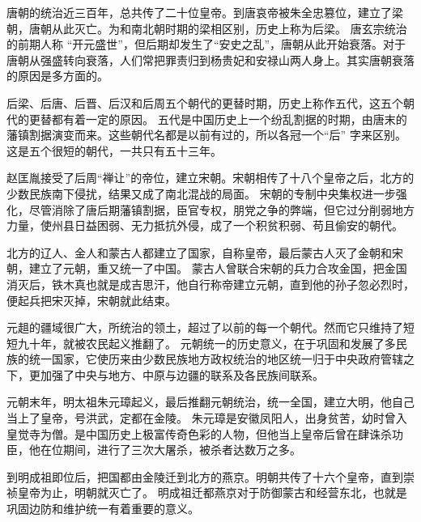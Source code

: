 \documentclass[avery5371,grid]{flashcards}
\begin{document}
{唐朝的统治近三百年，总共传了二十位皇帝。到唐哀帝被朱全忠篡位，建立了梁朝，唐朝从此灭亡。为和南北朝时期的梁相区别，历史上称为后梁。} %
{唐玄宗统治的前期人称 “开元盛世”，但后期却发生了“安史之乱”，唐朝从此开始衰落。对于唐朝从强盛转向衰落，人们常把罪责归到杨贵妃和安禄山两人身上。其实唐朝衰落的原因是多方面的。} %

{后梁、后唐、后晋、后汉和后周五个朝代的更替时期，历史上称作五代，这五个朝代的更替都有着一定的原因。} %
{五代是中国历史上一个纷乱割据的时期，由唐末的藩镇割据演变而来。这些朝代名都是以前有过的，所以各冠一个“后” 字来区别。这是五个很短的朝代，一共只有五十三年。} %

{赵匡胤接受了后周“禅让”的帝位，建立宋朝。宋朝相传了十八个皇帝之后，北方的少数民族南下侵扰，结果又成了南北混战的局面。} %
{宋朝的专制中央集权进一步强化，尽管消除了唐后期藩镇割据，臣官专权，朋党之争的弊端，但它过分削弱地方力量，使州县日益困弱、无力抵抗外侵，成了一个积贫积弱、苟且偷安的朝代。} %



{北方的辽人、金人和蒙古人都建立了国家，自称皇帝，最后蒙古人灭了金朝和宋朝，建立了元朝，重又统一了中国。} %
{蒙古人曾联合宋朝的兵力合攻金国，把金国消灭后，铁木真也就是成吉思汗，他自行称帝建立元朝，直到他的孙子忽必烈时，便起兵把宋灭掉，宋朝就此结束。} %

{元趄的疆域很广大，所统治的领土，超过了以前的每一个朝代。然而它只维持了短短九十年，就被农民起义推翻了。} %
{元朝统一的历史意义，在于巩固和发展了多民族的统一国家，它使历来由少数民族地方政权统治的地区统一归于中央政府管辖之下，更加强了中央与地方、中原与边疆的联系及各民族间联系。} %

{元朝末年，明太祖朱元璋起义，最后推翻元朝统治，统一全国，建立大明，他自己当上了皇帝，号洪武，定都在金陵。} %
{朱元璋是安徽凤阳人，出身贫苦，幼时曾入皇觉寺为僧。是中国历史上极富传奇色彩的人物，但他当上皇帝后曾在肆诛杀功臣，他在位期间，进行了三次大屠杀，被杀者达数万之多。} %

{到明成祖即位后，把国都由金陵迁到北方的燕京。明朝共传了十六个皇帝，直到崇祯皇帝为止，明朝就灭亡了。} %
{明成祖迁都燕京对于防御蒙古和经营东北，也就是巩固边防和维护统一有着重要的意义。} %
\end{document}
